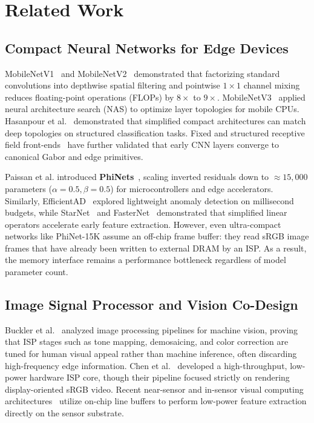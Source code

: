 \documentclass[conference]{IEEEtran}
\begin{document}
\section{Related Work}
\label{sec:related}

\subsection{Compact Neural Networks for Edge Devices}
MobileNetV1~\cite{howard2017mobilenets} and MobileNetV2~\cite{sandler2018mobilenetv2} demonstrated that factorizing standard convolutions into depthwise spatial filtering and pointwise $1\times1$ channel mixing reduces floating-point operations (FLOPs) by $8\times$ to $9\times$. MobileNetV3~\cite{howard2019searching} applied neural architecture search (NAS) to optimize layer topologies for mobile CPUs. Hasanpour et al.~\cite{hasanpour2016lets} demonstrated that simplified compact architectures can match deep topologies on structured classification tasks. Fixed and structured receptive field front-ends~\cite{jacobsen2016structured, sarwar2017gabor} have further validated that early CNN layers converge to canonical Gabor and edge primitives.

Paissan et al. introduced \textbf{PhiNets}~\cite{paissan2022phinets}, scaling inverted residuals down to $\approx 15,000$ parameters ($\alpha=0.5, \beta=0.5$) for microcontrollers and edge accelerators. Similarly, EfficientAD~\cite{batzner2024efficientad} explored lightweight anomaly detection on millisecond budgets, while StarNet~\cite{ma2024rewrite} and FasterNet~\cite{chen2023run} demonstrated that simplified linear operators accelerate early feature extraction. However, even ultra-compact networks like PhiNet-15K assume an off-chip frame buffer: they read sRGB image frames that have already been written to external DRAM by an ISP. As a result, the memory interface remains a performance bottleneck regardless of model parameter count.

\subsection{Image Signal Processor and Vision Co-Design}
Buckler et al.~\cite{buckler2018reconfiguring} analyzed image processing pipelines for machine vision, proving that ISP stages such as tone mapping, demosaicing, and color correction are tuned for human visual appeal rather than machine inference, often discarding high-frequency edge information. Chen et al.~\cite{chen2020highspeed} developed a high-throughput, low-power hardware ISP core, though their pipeline focused strictly on rendering display-oriented sRGB video. Recent near-sensor and in-sensor visual computing architectures~\cite{murakami2020intelligent} utilize on-chip line buffers to perform low-power feature extraction directly on the sensor substrate.
\end{document}
